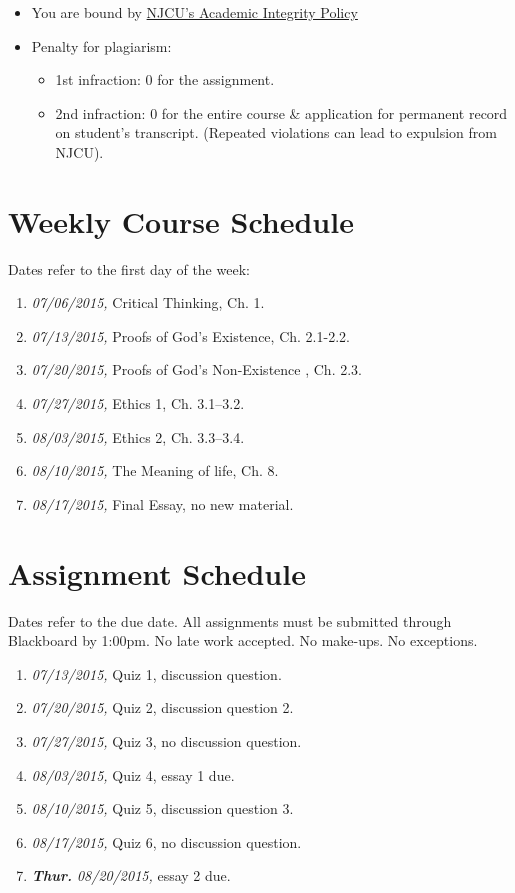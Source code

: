 \documentclass[11pt,article,oneside]{memoir}
\begin{document}
\begin{itemize} 
\item You are bound by \href{http://www.njcu.edu/uploadedFiles/About_NJCU/Governance_and_Organization/University_Senate/Policies/Academic\%20INTEGRITY\%20POLICY\%20FINAL\%202-04.pdf}{NJCU's Academic Integrity Policy}
\item Penalty for plagiarism:
\begin{itemize}
\item 1st infraction: 0 for the assignment. 
\item 2nd infraction: 0 for the entire course \& application for permanent record on student's transcript. (Repeated violations can lead to expulsion from NJCU). 
\end{itemize}
\end{itemize}


\section{Weekly Course Schedule}
Dates refer to the first day of the week: 
\begin{enumerate}
\item \textit{07/06/2015,} Critical Thinking, Ch. 1.
\item \textit{07/13/2015,} Proofs of God's Existence, Ch. 2.1-2.2. 
\item \textit{07/20/2015,} Proofs of God's Non-Existence , Ch. 2.3.
\item \textit{07/27/2015,} Ethics 1, Ch. 3.1--3.2.
\item \textit{08/03/2015,} Ethics 2, Ch. 3.3--3.4.
\item \textit{08/10/2015,} The Meaning of life, Ch. 8. 
\item \textit{08/17/2015,} Final Essay, no new material.
\end{enumerate}

\section{Assignment Schedule}
Dates refer to the due date. All assignments must be submitted through Blackboard by 1:00pm. No late work accepted. No make-ups. No exceptions. 

\begin{enumerate}
\item \textit{07/13/2015,} Quiz 1, discussion question. 
\item \textit{07/20/2015,} Quiz 2, discussion question 2.
\item \textit{07/27/2015,} Quiz 3, no discussion question. 
\item \textit{08/03/2015,} Quiz 4, essay 1 due.
\item \textit{08/10/2015,} Quiz 5, discussion question 3.
\item \textit{08/17/2015,} Quiz 6, no discussion question.
\item \textit{\textbf{Thur.} 08/20/2015,} essay 2 due.
\end{enumerate}
\end{document}
